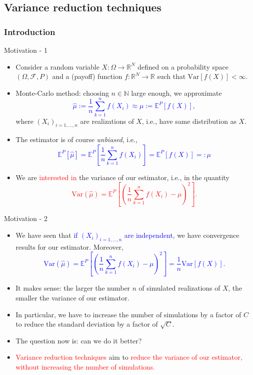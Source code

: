 \documentclass[9 pt]{beamer} %
\def \blue {\textcolor{blue}}
\def \red {\textcolor{red}}
\def \F {\mathcal{F}}
\begin{document}
\subsection{Variance reduction techniques}
\frame{  \tableofcontents[
    sectionstyle=show/shaded,
    subsectionstyle=show/shaded/shaded,
    subsubsectionstyle=show/shaded/shaded/shaded
    ]}
    

\subsubsection{Introduction}
\frame{  \tableofcontents[
    sectionstyle=show/shaded,
    subsectionstyle=show/shaded/shaded,
    subsubsectionstyle=show/shaded/shaded/shaded
    ]}
    
\begin{frame}{Motivation - 1}
\begin{itemize}
 \item Consider a random variable $X: \Omega \to \mathbb{R}^N$ defined on a probability space $(\Omega, \F, P)$ and a (payoff) function $f: \mathbb{R}^N \to \mathbb{R}$ such that $\text{Var}[f(X)] < \infty$. 
 \item Monte-Carlo method: choosing $n \in \mathbb{N}$ large enough, we approximate
\blue{ $$
 \hat \mu := \frac{1}{n} \sum_{k=1}^n f(X_i) \approx \mu := \mathbb{E}^P[f(X)], 
 $$}
 where $(X_i)_{i = 1, \dots, n}$ are realizations of $X$, i.e., have same distribution as $X$.
 \item The estimator is of course \emph{unbiased}, i.e.,
\blue{$$
 \mathbb{E}^P\left[\hat \mu\right] = \mathbb{E}^P\left[\frac{1}{n} \sum_{k=1}^n f(X_i)\right] =\mathbb{E}^P\left[f(X)\right] =:\mu
 $$}
 \item We are \red{interested in} the variance of our estimator, i.e., in the quantity
 \red{$$
\text{Var}\left( \hat \mu\right)=\mathbb{E}^P\left[\left(\frac{1}{n} \sum_{k=1}^n f(X_i)- \mu\right)^2\right].
 $$}
 \end{itemize}
\end{frame}


\begin{frame}{Motivation - 2}
\begin{itemize}
\item We have seen that \blue{if $(X_i)_{i = 1, \dots, n}$ are independent}, we have convergence results for our estimator. Moreover, 
 \blue{$$
 \text{Var}\left( \hat \mu\right)= \mathbb{E}^P\left[\left(\frac{1}{n} \sum_{k=1}^n f(X_i)- \mu\right)^2\right] = \frac{1}{n}\text{Var}[f(X)].
 $$}
 \item It makes sense: the larger the number $n$ of simulated realizations of $X$, the smaller the variance of our estimator. 
 \item In particular, we have to increase the number of simulations by a factor of $C$ to reduce the standard deviation by a factor of $\sqrt{C}$.
 \item The question now is: can we do it better? 
 \item \red{Variance reduction techniques} aim to \red{reduce the variance of our estimator, without increasing the number of simulations.}
 \end{itemize}
\end{frame}
\end{document}
